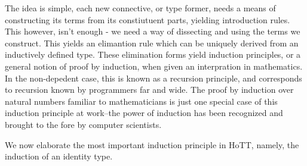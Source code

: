 \documentclass[11pt, a4paper]{article}
\begin{document}
The idea is simple, each new connective, or type former, needs a means of
constructing its terms from its constiutuent parts, yielding introduction
rules. This however, isn't enough - we need a way of dissecting and using the
terms we construct. This yields an elimantion rule which can be uniquely
derived from an inductively defined type. These elimination forms yield
induction principles, or a general notion of proof by induction, when given an
interpration in mathematics. In the non-depedent case, this is known as a
recursion principle, and corresponds to recursion known by programmers far and
wide.  The proof by induction over natural numbers familiar to mathematicians
is just one special case of this induction principle at work--the power of
induction has been recognized and brought to the fore by computer scientists.

We now elaborate the most important induction principle in HoTT, namely, the
induction of an identity type.
\end{document}
